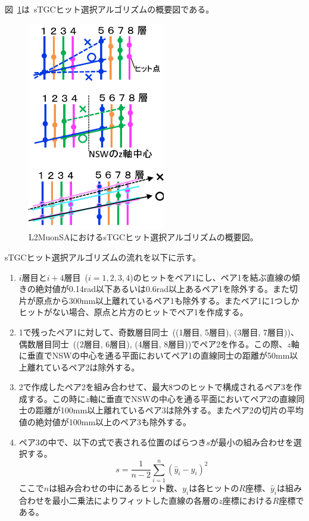 図~\ref{fig:5-1}は~sTGCヒット選択アルゴリズムの概要図である。

\begin{figure}[H]
  \centering
  \includegraphics[clip, width=6cm]{fig/5/sTGC_hitSelectAlg.png}
  \caption{L2MuonSAにおけるsTGCヒット選択アルゴリズムの概要図\cite{article:kumaokaJPS}。}
  \label{fig:5-1}
\end{figure}

sTGCヒット選択アルゴリズムの流れを以下に示す。
\begin{enumerate}
    \item $i$層目と$i+4$層目~($i=1, 2, 3, 4$)のヒットをペア1にし、ペア1を結ぶ直線の傾きの絶対値が0.14rad以下あるいは0.6rad以上あるペア1を除外する。また切片が原点から300mm以上離れているペア1も除外する。またペア1に1つしかヒットがない場合、原点と片方のヒットでペア1を作成する。
    \item 1で残ったペア1に対して、奇数層目同士~((1層目, 5層目), (3層目, 7層目))、偶数層目同士~((2層目, 6層目), (4層目, 8層目))でペア2を作る。この際、$z$軸に垂直でNSWの中心を通る平面においてペア1の直線同士の距離が50mm以上離れているペア2は除外する。
    \item 2で作成したペア2を組み合わせて、最大8つのヒットで構成されるペア3を作成する。この時に$z$軸に垂直でNSWの中心を通る平面においてペア2の直線同士の距離が100mm以上離れているペア3は除外する。またペア2の切片の平均値の絶対値が100mm以上のペア3も除外する。
    \item ペア3の中で、以下の式で表される位置のばらつき$s$が最小の組み合わせを選択する。
    \begin{equation}
        s=\frac{1}{n-2} \sum_{i=1}^n\left(\hat{y}_i-y_i\right)^2\label{equ5-1}
    \end{equation}
    ここで$n$は組み合わせの中にあるヒット数、$y_i$は各ヒットの$R$座標、$\hat{y}_i$は組み合わせを最小二乗法によりフィットした直線の各層の$z$座標における$R$座標である。
\end{enumerate}

